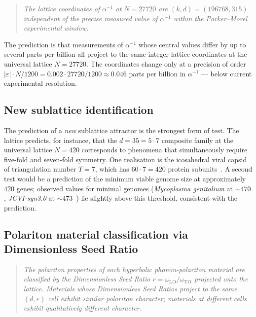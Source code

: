 \documentclass[11pt,a4paper]{article}
\theoremstyle{definition}
\theoremstyle{remark}
\newcommand{\eps}{\varepsilon}
\begin{document}
\begin{quote}\itshape
The lattice coordinates of $\alpha^{-1}$ at $N=27720$ are $(k,d)=(196768,315)$ independent of the precise measured value of $\alpha^{-1}$ within the Parker--Morel experimental window.
\end{quote}

The prediction is that measurements of $\alpha^{-1}$ whose central values differ by up to several parts per billion all project to the same integer lattice coordinates at the universal lattice $N=27720$. The coordinates change only at a precision of order $|\eps|\cdot N/1200 = 0.002\cdot 27720/1200 \approx 0.046$ parts per billion in $\alpha^{-1}$ --- below current experimental resolution.

\subsection{New sublattice identification}

The prediction of a \emph{new} sublattice attractor is the strongest form of test. The lattice predicts, for instance, that the $d=35 = 5\cdot 7$ composite family at the universal lattice $N=420$ corresponds to phenomena that simultaneously require five-fold and seven-fold symmetry. One realisation is the icosahedral viral capsid of triangulation number $T=7$, which has $60\cdot 7 = 420$ protein subunits~\cite{CasparKlug}. A second test would be a prediction of the minimum viable genome size at approximately $420$ genes; observed values for minimal genomes (\emph{Mycoplasma genitalium} at $\sim 470$, \emph{JCVI-syn3.0} at $\sim 473$~\cite{Hutchison2016}) lie slightly above this threshold, consistent with the prediction.

\subsection{Polariton material classification via Dimensionless Seed Ratio}\label{subsec:polariton-prediction}

\begin{quote}\itshape
The polariton properties of each hyperbolic phonon-polariton material are classified by the Dimensionless Seed Ratio $r = \omega_{\mathrm{LO}}/\omega_{\mathrm{TO}}$ projected onto the lattice. Materials whose Dimensionless Seed Ratios project to the same $(d, \varepsilon)$ cell exhibit similar polariton character; materials at different cells exhibit qualitatively different character.
\end{quote}
\end{document}
